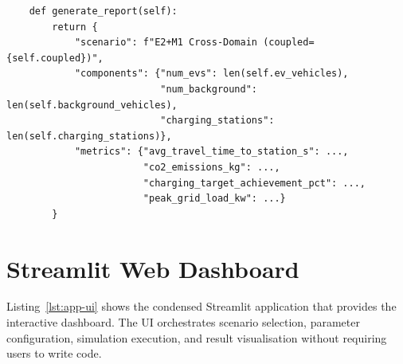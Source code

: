 \begin{listing}[H]
\begin{verbatim}
    def generate_report(self):
        return {
            "scenario": f"E2+M1 Cross-Domain (coupled={self.coupled})",
            "components": {"num_evs": len(self.ev_vehicles),
                           "num_background": len(self.background_vehicles),
                           "charging_stations": len(self.charging_stations)},
            "metrics": {"avg_travel_time_to_station_s": ...,
                        "co2_emissions_kg": ...,
                        "charging_target_achievement_pct": ...,
                        "peak_grid_load_kw": ...}
        }
\end{verbatim}
\caption{\texttt{scenarios/scenario\_e2m1.py} --- Cross-domain energy--mobility coupling (condensed)}
\label{lst:app-crossdomain}
\end{listing}

\section{Streamlit Web Dashboard}
\label{sec:code-ui}

Listing~\ref{lst:app-ui} shows the condensed Streamlit application that provides the interactive dashboard. The UI orchestrates scenario selection, parameter configuration, simulation execution, and result visualisation without requiring users to write code.

